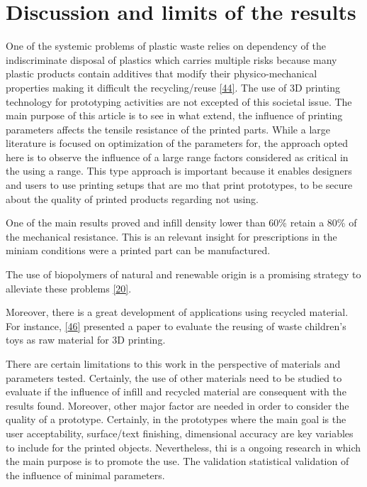 \documentclass[conference,final,]{IEEEtran}
\begin{document}
\hypertarget{discussion-and-limits-of-the-results}{%
\section{Discussion and limits of the
results}\label{discussion-and-limits-of-the-results}}

One of the systemic problems of plastic waste relies on dependency of
the indiscriminate disposal of plastics which carries multiple risks
because many plastic products contain additives that modify their
physico-mechanical properties making it difficult the recycling/reuse
\protect\hyperlink{ref-Wagner2020}{{[}44{]}}. The use of 3D printing
technology for prototyping activities are not excepted of this societal
issue. The main purpose of this article is to see in what extend, the
influence of printing parameters affects the tensile resistance of the
printed parts. While a large literature is focused on optimization of
the parameters for, the approach opted here is to observe the influence
of a large range factors considered as critical in the using a range.
This type approach is important because it enables designers and users
to use printing setups that are mo that print prototypes, to be secure
about the quality of printed products regarding not using.

One of the main results proved and infill density lower than 60\% retain
a 80\% of the mechanical resistance. This is an relevant insight for
prescriptions in the miniam conditions were a printed part can be
manufactured.

The use of biopolymers of natural and renewable origin is a promising
strategy to alleviate these problems
\protect\hyperlink{ref-Liu2019a}{{[}20{]}}.

Moreover, there is a great development of applications using recycled
material. For instance,
\protect\hyperlink{ref-Nur-A-Tomal2020}{{[}46{]}} presented a paper to
evaluate the reusing of waste children's toys as raw material for 3D
printing.

There are certain limitations to this work in the perspective of
materials and parameters tested. Certainly, the use of other materials
need to be studied to evaluate if the influence of infill and recycled
material are consequent with the results found. Moreover, other major
factor are needed in order to consider the quality of a prototype.
Certainly, in the prototypes where the main goal is the user
acceptability, surface/text finishing, dimensional accuracy are key
variables to include for the printed objects. Nevertheless, thi is a
ongoing research in which the main purpose is to promote the use. The
validation statistical validation of the influence of minimal
parameters.
\end{document}
